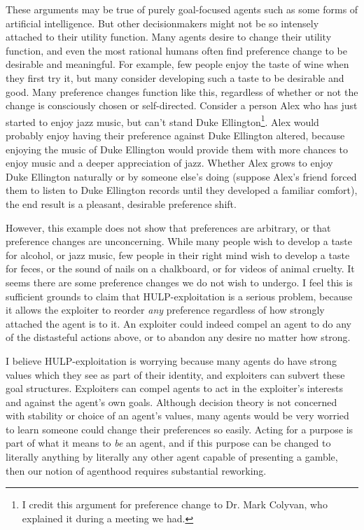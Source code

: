 \documentclass{article}
\begin{document}
These arguments may be true of purely goal-focused agents such as some forms of artificial intelligence. But other decisionmakers might not be so intensely attached to their utility function. Many agents desire to change their utility function, and even the most rational humans often find preference change to be desirable and meaningful. For example, few people enjoy the taste of wine when they first try it, but many consider developing such a taste to be desirable and good. Many preference changes function like this, regardless of whether or not the change is consciously chosen or self-directed. Consider a person Alex who has just started to enjoy jazz music, but can't stand Duke Ellington\footnote{I credit this argument for preference change to Dr. Mark Colyvan, who explained it during a meeting we had.}. Alex would probably enjoy having their preference against Duke Ellington altered, because enjoying the music of Duke Ellington would provide them with more chances to enjoy music and a deeper appreciation of jazz. Whether Alex grows to enjoy Duke Ellington naturally or by someone else's doing (suppose Alex's friend forced them to listen to Duke Ellington records until they developed a familiar comfort), the end result is a pleasant, desirable preference shift.

However, this example does not show that preferences are arbitrary, or that preference changes are unconcerning. While many people wish to develop a taste for alcohol, or jazz music, few people in their right mind wish to develop a taste for feces, or the sound of nails on a chalkboard, or for videos of animal cruelty. It seems there are some preference changes we do not wish to undergo. I feel this is sufficient grounds to claim that HULP-exploitation is a serious problem, because it allows the exploiter to reorder \textit{any} preference regardless of how strongly attached the agent is to it. An exploiter could indeed compel an agent to do any of the distasteful actions above, or to abandon any desire no matter how strong.

I believe HULP-exploitation is worrying because many agents do have strong values which they see as part of their identity, and exploiters can subvert these goal structures. Exploiters can compel agents to act in the exploiter's interests and against the agent's own goals. Although decision theory is not concerned with stability or choice of an agent's values, many agents would be very worried to learn someone could change their preferences so easily. Acting for a purpose is part of what it means to \textit{be} an agent, and if this purpose can be changed to literally anything by literally any other agent capable of presenting a gamble, then our notion of agenthood requires substantial reworking.
\end{document}
